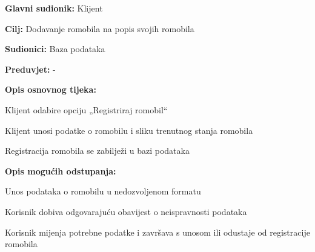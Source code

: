 						\noindent {}
						\begin{packed_item}
							
							\item \textbf{Glavni sudionik: }Klijent
							\item  \textbf{Cilj: }Dodavanje romobila na popis svojih romobila
							\item  \textbf{Sudionici: }Baza podataka
							\item  \textbf{Preduvjet: }-
							\item  \textbf{Opis osnovnog tijeka:}
							
							\item[] \begin{packed_enum}
								
								\item Klijent odabire opciju „Registriraj romobil“ 
								\item Klijent unosi podatke o romobilu i sliku trenutnog stanja romobila 
								\item Registracija romobila se zabilježi u bazi podataka 
								  
							\end{packed_enum}
							
							\item  \textbf{Opis mogućih odstupanja:}
							
							\item[] \begin{packed_item}
								
								\item[2.a] Unos podataka o romobilu u nedozvoljenom formatu 
								\item[] \begin{packed_enum}
									
									\item Korisnik dobiva odgovarajuću obavijest o neispravnosti podataka 
									\item Korisnik mijenja potrebne podatke i završava s unosom ili odustaje od registracije romobila 
									
								\end{packed_enum}
								
								
							\end{packed_item}
						\end{packed_item}
						\noindent {}
